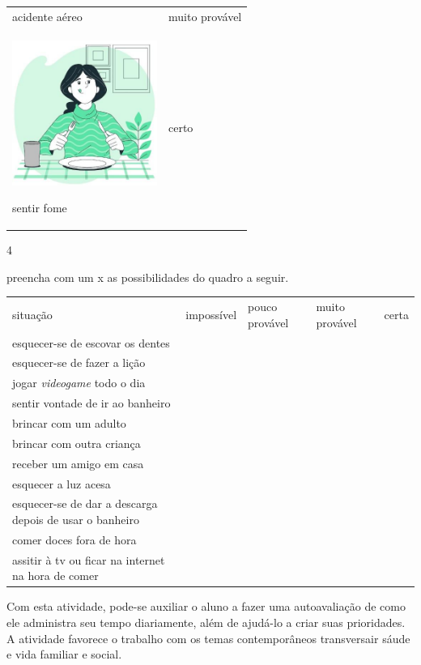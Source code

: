 \begin{longtable}[]{@{}ll@{}}
\begin{minipage}[t]{0.48\columnwidth}
acidente aéreo\strut
\end{minipage} & \begin{minipage}[t]{0.48\columnwidth}\raggedright\strut
muito provável\strut
\end{minipage}\tabularnewline
\begin{minipage}[t]{0.48\columnwidth}\raggedright\strut
\includegraphics[width=1.86458in,height=1.86458in]{media/image85.jpg}

sentir fome\strut
\end{minipage} & \begin{minipage}[t]{0.48\columnwidth}\raggedright\strut
certo\strut
\end{minipage}\tabularnewline
\bottomrule
\end{longtable}

\num{4}

preencha com um x as possibilidades do quadro a seguir.

\begin{longtable}[]{@{}lllll@{}}
\toprule
situação & impossível & pouco provável & muito provável &
certa\tabularnewline
esquecer-se de escovar os dentes & & & &\tabularnewline
esquecer-se de fazer a lição & & & &\tabularnewline
jogar \textit{videogame} todo o dia & & & &\tabularnewline
sentir vontade de ir ao banheiro & & & &\tabularnewline
brincar com um adulto & & & &\tabularnewline
brincar com outra criança & & & &\tabularnewline
receber um amigo em casa & & & &\tabularnewline
esquecer a luz acesa & & & &\tabularnewline
esquecer-se de dar a descarga depois de usar o banheiro & & &
&\tabularnewline
comer doces fora de hora & & & &\tabularnewline
assitir à tv ou ficar na internet na hora de comer & & & &\tabularnewline
\bottomrule
\end{longtable}

Com esta atividade, pode-se auxiliar o aluno a fazer uma autoavaliação de como ele administra seu tempo diariamente, além de ajudá-lo
a criar suas prioridades. A atividade favorece o trabalho com os temas contemporâneos transversair sáude e vida familiar e social.

